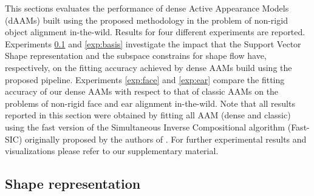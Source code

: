 This sections evaluates the performance of dense Active Appearance Models (dAAMs) built using the proposed methodology in the problem of non-rigid object alignment in-the-wild. Results for four different experiments are reported. Experiments \ref{exp:svs} and \ref{exp:basis} investigate the impact that the Support Vector Shape representation and the subspace constrains for shape flow have, respectively, on the fitting accuracy achieved by dense AAMs build using the proposed pipeline. Experiments \ref{exp:face} and \ref{exp:ear} compare the fitting accuracy of our dense AAMs with respect to that of classic AAMs on the problems of non-rigid face and ear alignment in-the-wild. 
Note that all results reported in this section were obtained by fitting all AAM (dense and classic) using the fast version of the Simultaneous Inverse Compositional algorithm (Fast-SIC) originally proposed by the authors of \cite{Papandreou2008}. For further experimental results and visualizations please refer to our supplementary material. 



\subsection{Shape representation}
\label{exp:svs}

